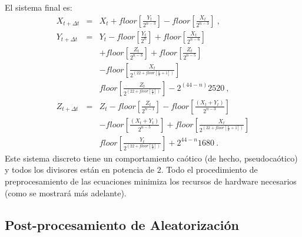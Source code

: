 El sistema final es:
%
\begin{eqnarray}\label{eq:Lorenz3}
{X}_{t+\Delta t}&=&{X}_{t}+floor\left[ {\frac{{Y}_{t}}{2^{{n-3}}}}
\right] -floor\left[{\frac{{X}_{t}}{2^{{n-3}}}}\right] \ , \nonumber \\
{Y}_{t+\Delta t}&=&{Y}_{t}-floor\left[
{\frac{{Y}_{t}}{2^n}}\right]
+floor\left[{\frac{{X}_{t}}{2^{{n-6}}}}\right]\nonumber \\
&& +floor\left[ {\frac{{Z}_{t}}{2^{{n-3}}}}\right] +
floor\left[{\frac{{Z}_{t}}{2^{{n-5}}}}\right]\nonumber \\
&&-floor\left[ {\frac{{X}_{t}}{2^{( 22+floor\left[
			{\frac{n}{2}+1}\right] )}
	}}\right] \nonumber \\
	&& floor\left[ {\frac{{Z}_{t}}{2^{( 22+floor\left[
				{\frac{n}{2}}\right] )}}}\right] -2^{(44-n)}2520 \ , \\
	{Z}_{t+\Delta t}&=&{Z}_{t}-floor\left[
	{\frac{{Z}_{t}}{2^{n-1}}}\right] -floor\left[
	{\frac{({X}_{t}+{Y}_{t})}{2^{n-3}}}\right]\nonumber \\
	&& -floor\left[ {\frac{({X}_{t}+{Y}_{t})}{2^{n-5}}}\right]
	+floor\left[ {\frac{{X}_{t}}{2^{( 22+floor\left[
				{\frac{n}{2}+1}\right]
				)}}}\right] \nonumber \\
	&& floor\left[ {\frac{{Y}_{t}}{2^{( 22+floor\left[
				{\frac{n}{2}}\right] )}}}\right]+2^{44-n}1680 \ . \nonumber
\end{eqnarray}
%
Este sistema discreto tiene un comportamiento caótico (de hecho, pseudocaótico) y todos los divisores están en potencia de $2$.
Todo el procedimiento de preprocesamiento de las ecuaciones minimiza los recursos de hardware necesarios (como se mostrará más adelante).

\subsection{Post-procesamiento de Aleatorización}

